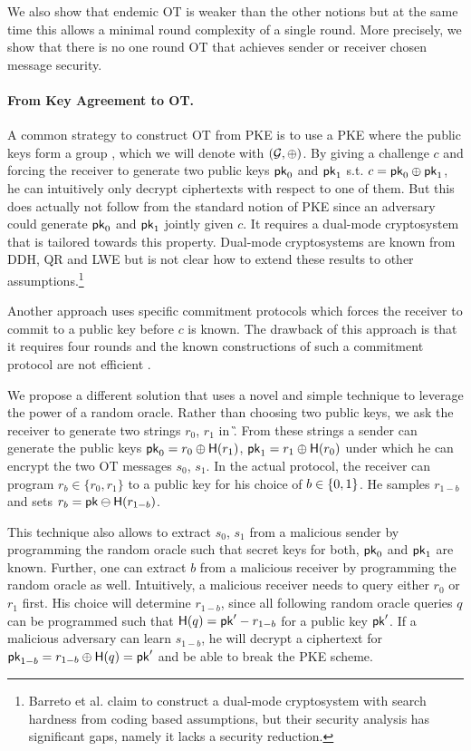 We also show that endemic OT is weaker than the other notions but at the same time this allows a minimal round complexity of a single round. More precisely, we show that there is no one round OT that achieves sender or receiver chosen message security.

\paragraph{From Key Agreement to OT.} A common strategy to construct OT from PKE is to use a PKE where the public keys form a group \cite{C:PeiVaiWat08}, which we will denote with $(\mathcal{G},\oplus)$. By giving a challenge $c$ and forcing the receiver to generate two public keys $\mathsf{pk}_0$ and $\mathsf{pk}_1$ s.t. $c=\mathsf{pk}_0\oplus \mathsf{pk}_1$, he can intuitively only decrypt ciphertexts with respect to one of them. But this does actually not follow from the standard notion of PKE since an adversary could generate $\mathsf{pk}_0$ and $\mathsf{pk}_1$ jointly given $c$. It requires a dual-mode cryptosystem \cite{C:PeiVaiWat08} that is tailored towards this property. Dual-mode cryptosystems are known from DDH, QR and LWE \cite{C:PeiVaiWat08} but is not clear how to extend these results to other assumptions.\footnote{Barreto et al. \cite{EPRINT:BDDMN17b} claim to construct a dual-mode cryptosystem with search hardness from coding based assumptions, but their security analysis has significant gaps, namely it lacks a security reduction.}

Another approach \cite{C:OstRicSca15,cryptoeprint:2018:473} uses specific commitment protocols which forces the receiver to commit to a public key before $c$ is known. The drawback of this approach is that it requires four rounds and the known constructions of such a commitment protocol are not efficient \cite{STOC:Kilian92,C:OstRicSca15}. 

We propose a different solution that uses a novel and simple technique to leverage the power of a random oracle. Rather than choosing two public keys, we ask the receiver to generate two strings $r_0$, $r_1$ in \G. From these strings a sender can generate the public keys $\mathsf{pk}_0=r_0\oplus\mathsf{H}(r_1)$, $\mathsf{pk}_1=r_1\oplus\mathsf{H}(r_0)$ under which he can encrypt the two OT messages $s_0$, $s_1$.
In the actual protocol, the receiver can program $r_b\in \{r_0,r_1\}$ to a public key 
for his choice of $b\in\{0,1\}$. He samples $r_{1-b}$ and sets $r_b=\mathsf{pk}\ominus\mathsf{H}(r_{1-b})$.

This technique also allows to extract $s_0$, $s_1$ from a malicious sender by programming the random oracle such that secret keys for both, $\mathsf{pk}_0$ and $\mathsf{pk}_1$ are known. Further, one can extract $b$ from a malicious receiver by programming the random oracle as well. Intuitively, a malicious receiver needs to query either $r_0$ or $r_1$ first. His choice will determine $r_{1-b}$, since all following random oracle queries $q$ can be programmed such that $\mathsf{H}(q)=\mathsf{pk}'-r_{1-b}$ for a public key $\mathsf{pk}'$. If a malicious adversary can learn $s_{1-b}$, he will decrypt a ciphertext for $\mathsf{pk}_{1-b}=r_{1-b}\oplus\mathsf{H}(q)=\mathsf{pk}'$ and be able to break the PKE scheme.

